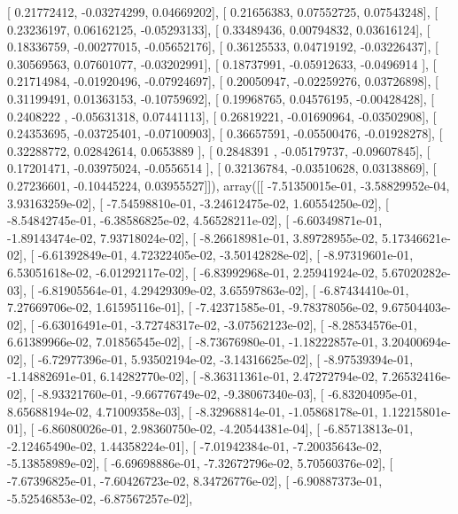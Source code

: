 \documentclass{article}
\begin{document}
       [ 0.21772412, -0.03274299,  0.04669202],
       [ 0.21656383,  0.07552725,  0.07543248],
       [ 0.23236197,  0.06162125, -0.05293133],
       [ 0.33489436,  0.00794832,  0.03616124],
       [ 0.18336759, -0.00277015, -0.05652176],
       [ 0.36125533,  0.04719192, -0.03226437],
       [ 0.30569563,  0.07601077, -0.03202991],
       [ 0.18737991, -0.05912633, -0.0496914 ],
       [ 0.21714984, -0.01920496, -0.07924697],
       [ 0.20050947, -0.02259276,  0.03726898],
       [ 0.31199491,  0.01363153, -0.10759692],
       [ 0.19968765,  0.04576195, -0.00428428],
       [ 0.2408222 , -0.05631318,  0.07441113],
       [ 0.26819221, -0.01690964, -0.03502908],
       [ 0.24353695, -0.03725401, -0.07100903],
       [ 0.36657591, -0.05500476, -0.01928278],
       [ 0.32288772,  0.02842614,  0.0653889 ],
       [ 0.2848391 , -0.05179737, -0.09607845],
       [ 0.17201471, -0.03975024, -0.0556514 ],
       [ 0.32136784, -0.03510628,  0.03138869],
       [ 0.27236601, -0.10445224,  0.03955527]]), array([[ -7.51350015e-01,  -3.58829952e-04,   3.93163259e-02],
       [ -7.54598810e-01,  -3.24612475e-02,   1.60554250e-02],
       [ -8.54842745e-01,  -6.38586825e-02,   4.56528211e-02],
       [ -6.60349871e-01,  -1.89143474e-02,   7.93718024e-02],
       [ -8.26618981e-01,   3.89728955e-02,   5.17346621e-02],
       [ -6.61392849e-01,   4.72322405e-02,  -3.50142828e-02],
       [ -8.97319601e-01,   6.53051618e-02,  -6.01292117e-02],
       [ -6.83992968e-01,   2.25941924e-02,   5.67020282e-03],
       [ -6.81905564e-01,   4.29429309e-02,   3.65597863e-02],
       [ -6.87434410e-01,   7.27669706e-02,   1.61595116e-01],
       [ -7.42371585e-01,  -9.78378056e-02,   9.67504403e-02],
       [ -6.63016491e-01,  -3.72748317e-02,  -3.07562123e-02],
       [ -8.28534576e-01,   6.61389966e-02,   7.01856545e-02],
       [ -8.73676980e-01,  -1.18222857e-01,   3.20400694e-02],
       [ -6.72977396e-01,   5.93502194e-02,  -3.14316625e-02],
       [ -8.97539394e-01,  -1.14882691e-01,   6.14282770e-02],
       [ -8.36311361e-01,   2.47272794e-02,   7.26532416e-02],
       [ -8.93321760e-01,  -9.66776749e-02,  -9.38067340e-03],
       [ -6.83204095e-01,   8.65688194e-02,   4.71009358e-03],
       [ -8.32968814e-01,  -1.05868178e-01,   1.12215801e-01],
       [ -6.86080026e-01,   2.98360750e-02,  -4.20544381e-04],
       [ -6.85713813e-01,  -2.12465490e-02,   1.44358224e-01],
       [ -7.01942384e-01,  -7.20035643e-02,  -5.13858989e-02],
       [ -6.69698886e-01,  -7.32672796e-02,   5.70560376e-02],
       [ -7.67396825e-01,  -7.60426723e-02,   8.34726776e-02],
       [ -6.90887373e-01,  -5.52546853e-02,  -6.87567257e-02],
\end{document}
